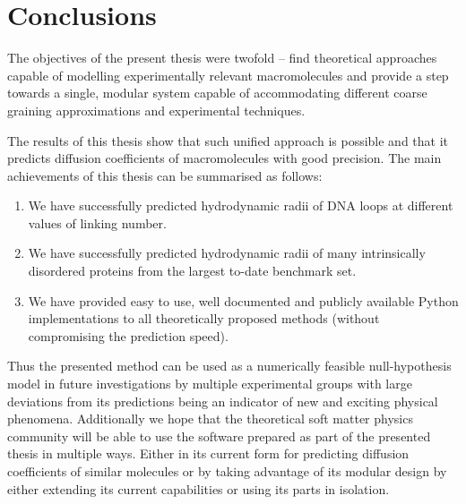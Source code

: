 \documentclass{doctoral}
\begin{document}
\chapter{Conclusions}

The objectives of the present thesis were twofold -- find theoretical approaches capable of modelling experimentally relevant macromolecules and provide a step towards a single, modular system capable of accommodating different coarse graining approximations and experimental techniques.

The results of this thesis show that such unified approach is possible and that it predicts diffusion coefficients of macromolecules with good precision.
The main achievements of this thesis can be summarised as follows:
\begin{enumerate}
    \item We have successfully predicted hydrodynamic radii of DNA loops at different values of linking number.
    \item We have successfully predicted hydrodynamic radii of many intrinsically disordered proteins from the largest to-date benchmark set.
    \item We have provided easy to use, well documented and publicly available Python implementations to all theoretically proposed methods (without compromising the prediction speed).
\end{enumerate}

Thus the presented method can be used as a numerically feasible null-hypothesis model in future investigations by multiple experimental groups with large deviations from its predictions being an indicator of new and exciting physical phenomena.
Additionally we hope that the theoretical soft matter physics community will be able to use the software prepared as part of the presented thesis in multiple ways.
Either in its current form for predicting diffusion coefficients of similar molecules or by taking advantage of its modular design by either extending its current capabilities or using its parts in isolation.

\printbibliography[heading=bibchapter]
\end{document}
